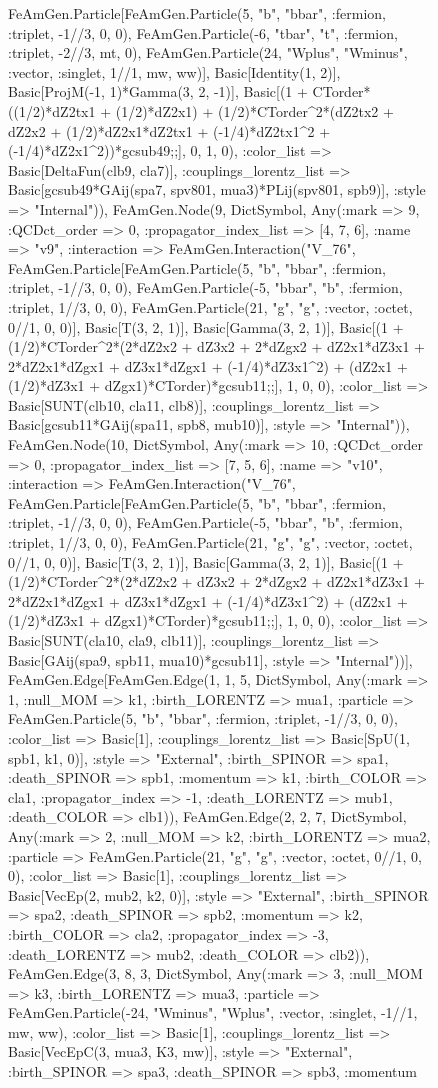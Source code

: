 \documentclass{revtex4}
\begin{document}
\begin{figure}[!htb]
\begin{center}
{FeAmGen.Particle[FeAmGen.Particle(5, "b", "bbar", :fermion, :triplet, -1//3, 0, 0), FeAmGen.Particle(-6, "tbar", "t", :fermion, :triplet, -2//3, mt, 0), FeAmGen.Particle(24, "Wplus", "Wminus", :vector, :singlet, 1//1, mw, ww)], Basic[Identity(1, 2)], Basic[ProjM(-1, 1)*Gamma(3, 2, -1)], Basic[(1 + CTorder*((1/2)*dZ2tx1 + (1/2)*dZ2x1) + (1/2)*CTorder^2*(dZ2tx2 + dZ2x2 + (1/2)*dZ2x1*dZ2tx1 + (-1/4)*dZ2tx1^2 + (-1/4)*dZ2x1^2))*gcsub49;;], 0, 1, 0), :color_list => Basic[DeltaFun(clb9, cla7)], :couplings_lorentz_list => Basic[gcsub49*GAij(spa7, spv801, mua3)*PLij(spv801, spb9)], :style => "Internal")), FeAmGen.Node(9, Dict{Symbol, Any}(:mark => 9, :QCDct_order => 0, :propagator_index_list => [4, 7, 6], :name => "v9", :interaction => FeAmGen.Interaction("V_76", FeAmGen.Particle[FeAmGen.Particle(5, "b", "bbar", :fermion, :triplet, -1//3, 0, 0), FeAmGen.Particle(-5, "bbar", "b", :fermion, :triplet, 1//3, 0, 0), FeAmGen.Particle(21, "g", "g", :vector, :octet, 0//1, 0, 0)], Basic[T(3, 2, 1)], Basic[Gamma(3, 2, 1)], Basic[(1 + (1/2)*CTorder^2*(2*dZ2x2 + dZ3x2 + 2*dZgx2 + dZ2x1*dZ3x1 + 2*dZ2x1*dZgx1 + dZ3x1*dZgx1 + (-1/4)*dZ3x1^2) + (dZ2x1 + (1/2)*dZ3x1 + dZgx1)*CTorder)*gcsub11;;], 1, 0, 0), :color_list => Basic[SUNT(clb10, cla11, clb8)], :couplings_lorentz_list => Basic[gcsub11*GAij(spa11, spb8, mub10)], :style => "Internal")), FeAmGen.Node(10, Dict{Symbol, Any}(:mark => 10, :QCDct_order => 0, :propagator_index_list => [7, 5, 6], :name => "v10", :interaction => FeAmGen.Interaction("V_76", FeAmGen.Particle[FeAmGen.Particle(5, "b", "bbar", :fermion, :triplet, -1//3, 0, 0), FeAmGen.Particle(-5, "bbar", "b", :fermion, :triplet, 1//3, 0, 0), FeAmGen.Particle(21, "g", "g", :vector, :octet, 0//1, 0, 0)], Basic[T(3, 2, 1)], Basic[Gamma(3, 2, 1)], Basic[(1 + (1/2)*CTorder^2*(2*dZ2x2 + dZ3x2 + 2*dZgx2 + dZ2x1*dZ3x1 + 2*dZ2x1*dZgx1 + dZ3x1*dZgx1 + (-1/4)*dZ3x1^2) + (dZ2x1 + (1/2)*dZ3x1 + dZgx1)*CTorder)*gcsub11;;], 1, 0, 0), :color_list => Basic[SUNT(cla10, cla9, clb11)], :couplings_lorentz_list => Basic[GAij(spa9, spb11, mua10)*gcsub11], :style => "Internal"))], FeAmGen.Edge[FeAmGen.Edge(1, 1, 5, Dict{Symbol, Any}(:mark => 1, :null_MOM => k1, :birth_LORENTZ => mua1, :particle => FeAmGen.Particle(5, "b", "bbar", :fermion, :triplet, -1//3, 0, 0), :color_list => Basic[1], :couplings_lorentz_list => Basic[SpU(1, spb1, k1, 0)], :style => "External", :birth_SPINOR => spa1, :death_SPINOR => spb1, :momentum => k1, :birth_COLOR => cla1, :propagator_index => -1, :death_LORENTZ => mub1, :death_COLOR => clb1)), FeAmGen.Edge(2, 2, 7, Dict{Symbol, Any}(:mark => 2, :null_MOM => k2, :birth_LORENTZ => mua2, :particle => FeAmGen.Particle(21, "g", "g", :vector, :octet, 0//1, 0, 0), :color_list => Basic[1], :couplings_lorentz_list => Basic[VecEp(2, mub2, k2, 0)], :style => "External", :birth_SPINOR => spa2, :death_SPINOR => spb2, :momentum => k2, :birth_COLOR => cla2, :propagator_index => -3, :death_LORENTZ => mub2, :death_COLOR => clb2)), FeAmGen.Edge(3, 8, 3, Dict{Symbol, Any}(:mark => 3, :null_MOM => k3, :birth_LORENTZ => mua3, :particle => FeAmGen.Particle(-24, "Wminus", "Wplus", :vector, :singlet, -1//1, mw, ww), :color_list => Basic[1], :couplings_lorentz_list => Basic[VecEpC(3, mua3, K3, mw)], :style => "External", :birth_SPINOR => spa3, :death_SPINOR => spb3, :momentum }
\end{center}
\end{figure}
\end{document}
